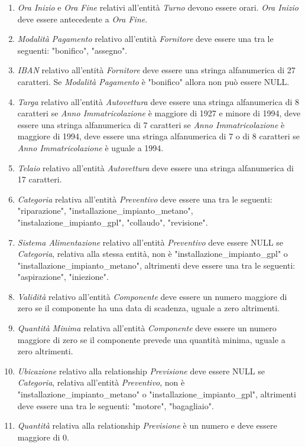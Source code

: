 \begin{enumerate}
				\item \emph{Ora Inizio} e \emph{Ora Fine} relativi all’entità \emph{Turno} devono essere orari. \emph{Ora Inizio} deve essere antecedente a \emph{Ora Fine}.
				
				\item \emph{Modalità Pagamento} relativo all'entità \emph{Fornitore} deve essere una tra le seguenti: "bonifico", "assegno".
				\item \emph{IBAN} relativo all’entità \emph{Fornitore} deve essere una stringa alfanumerica di 27 caratteri. Se \emph{Modalità Pagamento} è "bonifico" allora non può essere NULL.
				
				\item \emph{Targa} relativo all'entità \emph{Autovettura} deve essere una stringa alfanumerica di 8 caratteri se \emph{Anno Immatricolazione} è maggiore di 1927 e minore di 1994, deve essere una stringa alfanumerica di 7 caratteri se \emph{Anno Immatricolazione} è maggiore di 1994, deve essere una stringa alfanumerica di 7 o di 8 caratteri se \emph{Anno Immatricolazione} è uguale a 1994.
				\item \emph{Telaio} relativo all'entità \emph{Autovettura} deve essere una stringa alfanumerica di 17 caratteri.
				
				\item \emph{Categoria} relativa all'entità \emph{Preventivo} deve essere una tra le seguenti: "riparazione", "installazione\_impianto\_metano", "instalazione\_impianto\_gpl", "collaudo", "revisione".
				\item \emph{Sistema Alimentazione} relativo all'entità \emph{Preventivo} deve essere NULL se \emph{Categoria}, relativa alla stessa entità, non è "installazione\_impianto\_gpl" o "installazione\_impianto\_metano", altrimenti deve essere una tra le seguenti: "aspirazione", "iniezione".
				
				\item \emph{Validità} relativo all’entità \emph{Componente} deve essere un numero maggiore di zero se il componente ha una data di scadenza, uguale a zero altrimenti.
				\item \emph{Quantità Minima} relativa all’entità \emph{Componente} deve essere un numero maggiore di zero se il componente prevede una quantità minima, uguale a zero altrimenti.
				
				\item \emph{Ubicazione} relativo alla relationship \emph{Previsione} deve essere NULL se \emph{Categoria}, relativa all'entità \emph{Preventivo}, non è "installazione\_impianto\_metano" o "installazione\_impianto\_gpl", altrimenti deve essere una tra le seguenti: "motore", "bagagliaio".
				\item \emph{Quantità} relativa alla relationship \emph{Previsione} è un numero e deve essere maggiore di 0.
				

\end{enumerate}
